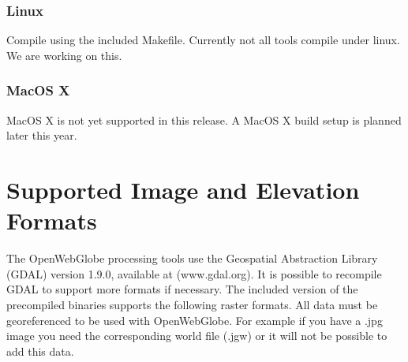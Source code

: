 \documentclass[
	12pt,
	a4paper,
	english,	
	appendixprefix,				     			        
	openany,		     	
	abstracton,		    		    
 	BCOR8mm,		    
]{scrartcl}
\begin{document}
\subsubsection{Linux}

Compile using the included Makefile. Currently not all tools compile under linux. We are working on this.

\subsubsection{MacOS X}

MacOS X is not yet supported in this release. A MacOS X build setup is planned later this year.



\section{Supported Image and Elevation Formats}

The OpenWebGlobe processing tools use the Geospatial Abstraction Library (GDAL) version 1.9.0, available at (www.gdal.org). It is possible to recompile GDAL to support more formats if necessary.
The included version of the precompiled binaries supports the following raster formats. All data must be georeferenced to be used with OpenWebGlobe.
For example if you have a .jpg image you need the corresponding world file (.jgw) or it will not be possible to add this data.
\end{document}
